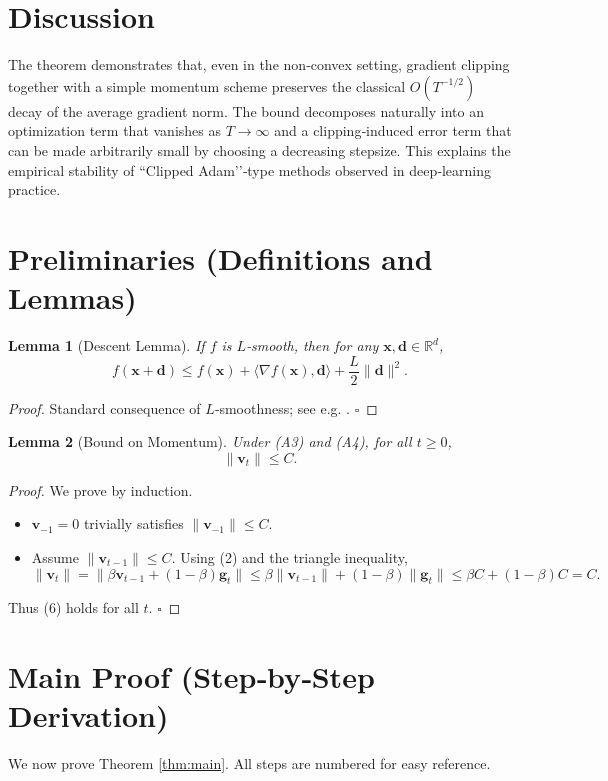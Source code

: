\documentclass{article}
\newtheorem{lemma}{Lemma}
\begin{document}
\section*{Discussion}
The theorem demonstrates that, even in the non‑convex setting, gradient clipping together with a simple momentum scheme preserves the classical $O(T^{-1/2})$ decay of the average gradient norm. The bound decomposes naturally into an optimization term that vanishes as $T\to\infty$ and a clipping‑induced error term that can be made arbitrarily small by choosing a decreasing stepsize. This explains the empirical stability of “Clipped Adam’’‑type methods observed in deep‑learning practice.

\newpage
\section*{Preliminaries (Definitions and Lemmas)}
\begin{lemma}[Descent Lemma]\label{lem:descent}
If $f$ is $L$‑smooth, then for any $\bm{x},\bm{d}\in\mathbb{R}^d$,
\[
f(\bm{x}+\bm{d})\le f(\bm{x})+\langle\nabla f(\bm{x}),\bm{d}\rangle+\frac{L}{2}\|\bm{d}\|^{2}.
\tag{5}
\]
\end{lemma}
\begin{proof}
Standard consequence of $L$‑smoothness; see e.g. \cite{nesterov2004introductory}. \hfill $\square$
\end{proof}

\begin{lemma}[Bound on Momentum]\label{lem:momentumbound}
Under (A3) and (A4), for all $t\ge0$,
\[
\|\bm{v}_t\|\le C .
\tag{6}
\]
\end{lemma}
\begin{proof}
We prove by induction.
\begin{itemize}
\item[Base:] $\bm{v}_{-1}=0$ trivially satisfies $\|\bm{v}_{-1}\|\le C$.
\item[Inductive step:] Assume $\|\bm{v}_{t-1}\|\le C$. Using (2) and the triangle inequality,
\[
\|\bm{v}_t\|
= \bigl\|\beta\bm{v}_{t-1}+(1-\beta)\bm{g}_t\bigr\|
\le \beta\|\bm{v}_{t-1}\|+(1-\beta)\|\bm{g}_t\|
\le \beta C+(1-\beta)C = C .
\]
\end{itemize}
Thus (6) holds for all $t$. \hfill $\square$
\end{proof}

\section*{Main Proof (Step‑by‑Step Derivation)}
We now prove Theorem \ref{thm:main}. All steps are numbered for easy reference.
\end{document}
